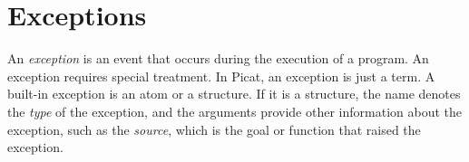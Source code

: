 \chapter{\label{chapter:exception}Exceptions}
An \emph{exception} is an event that occurs during the execution of a program.  An exception requires special treatment. In Picat, an exception is just a term. A built-in exception is an atom or a structure. If it is a structure, the name denotes the \emph{type} of the exception, and the arguments provide other information about the exception, such as the \emph{source}, which is the goal or function that raised the exception.

